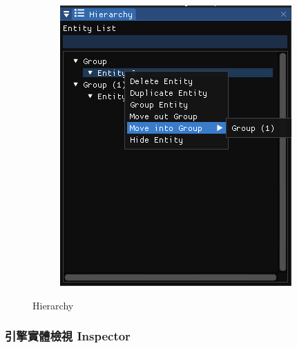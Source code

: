 \begin{figure}
\begin{subfigure}[b]{0.5\linewidth}
        \includegraphics[width=\linewidth]{./resources/editor/Hierarchy_b.png} 
    \end{subfigure}
\caption{Hierarchy}
\label{fig:Hierarchy}
\end{figure}

\newpage
\subsubsection{引擎實體檢視 Inspector}

